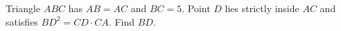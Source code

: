 Triangle $ABC$ has $AB=AC$ and $BC=5$. Point $D$ lies strictly inside $AC$ and satisfies $BD^2=CD\cdot CA$. Find $BD$.
